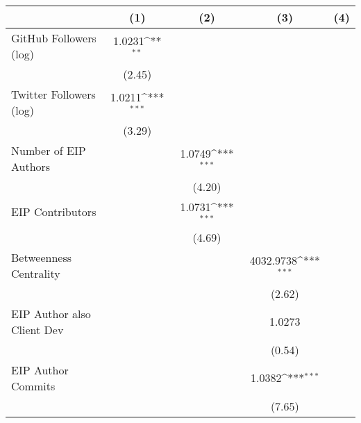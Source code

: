 {
\def\sym#1{\ifmmode^{#1}\else\(^{#1}\)\fi}
\begin{tabular}{l*{4}{c}}
\hline\hline
                                   &\multicolumn{1}{c}{(1)}         &\multicolumn{1}{c}{(2)}         &\multicolumn{1}{c}{(3)}         &\multicolumn{1}{c}{(4)}         \\
\hline
GitHub Followers (log)             &      1.0231\sym{**} &                     &                     &                     \\
                                   &      (2.45)         &                     &                     &                     \\
[1em]
Twitter Followers (log)            &      1.0211\sym{***}&                     &                     &                     \\
                                   &      (3.29)         &                     &                     &                     \\
[1em]
Number of EIP Authors              &                     &      1.0749\sym{***}&                     &                     \\
                                   &                     &      (4.20)         &                     &                     \\
[1em]
EIP Contributors                   &                     &      1.0731\sym{***}&                     &                     \\
                                   &                     &      (4.69)         &                     &                     \\
[1em]
Betweenness Centrality             &                     &                     &   4032.9738\sym{***}&                     \\
                                   &                     &                     &      (2.62)         &                     \\
[1em]
EIP Author also Client Dev         &                     &                     &      1.0273         &                     \\
                                   &                     &                     &      (0.54)         &                     \\
[1em]
EIP Author Commits                 &                     &                     &      1.0382\sym{***}&                     \\
                                   &                     &                     &      (7.65)         &                     \\

\end{tabular}}
